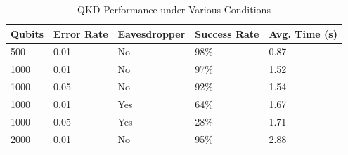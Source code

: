 \begin{table}[!htb]
\centering
\small
\begin{tabular}{|p{2.5cm}|p{2.5cm}|p{3cm}|p{2.8cm}|p{3cm}|}
\hline
\cellcolor{lightblue!30}\textbf{Qubits} & \cellcolor{lightblue!30}\textbf{Error Rate} & \cellcolor{lightblue!30}\textbf{Eavesdropper} & \cellcolor{lightblue!30}\textbf{Success Rate} & \cellcolor{lightblue!30}\textbf{Avg. Time (s)} \\
\hline
500 & 0.01 & No & 98\% & 0.87 \\
\hline
1000 & 0.01 & No & 97\% & 1.52 \\
\hline
1000 & 0.05 & No & 92\% & 1.54 \\
\hline
1000 & 0.01 & Yes & 64\% & 1.67 \\
\hline
1000 & 0.05 & Yes & 28\% & 1.71 \\
\hline
2000 & 0.01 & No & 95\% & 2.88 \\
\hline
\end{tabular}
\caption{QKD Performance under Various Conditions}
\label{tab:qkd_performance}
\end{table}